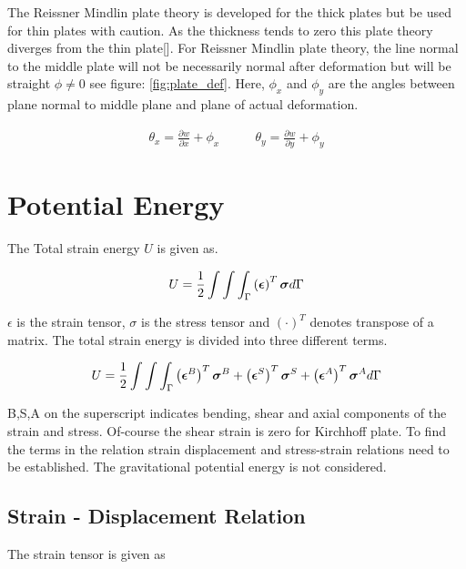 \documentclass[main.tex]{subfiles}
\begin{document}
The Reissner Mindlin plate theory is developed for the thick plates but be used for thin plates with caution.  As the thickness tends to zero this plate theory diverges from the thin plate[\cite{PlateandFEM}]. For Reissner Mindlin plate theory, the line normal to the middle plate will not be necessarily normal after deformation but will be straight $\phi \neq 0$ see figure: \ref{fig:plate_def}. Here, $\phi_x$ and $\phi_y$ are the angles between plane normal to middle plane and plane of actual deformation.  

\begin{align}
\theta_x  = \frac{\partial w }{\partial x} + \phi_x \quad & \quad
\theta_y  = \frac{\partial w }{\partial y} + \phi_y
\end{align}

\section{Potential Energy}

The Total strain energy $U$ is given as.

\begin{equation}
U=\frac{1}{2} \int\int\int_\Gamma \left(\boldsymbol{\epsilon}\right)^T \boldsymbol{\sigma} d \Gamma
\end{equation}

$\epsilon$ is the strain tensor, $\sigma$ is the stress tensor and $\left( \cdot \right)^T$ denotes transpose of a matrix. The total strain energy is divided into three different terms. 


\begin{equation}
U=\frac{1}{2} \int\int\int_\Gamma \left(\boldsymbol{\epsilon}^B\right)^T \boldsymbol{\sigma}^B + \left(\boldsymbol{\epsilon}^S\right)^T \boldsymbol{\sigma}^S + \left(\boldsymbol{\epsilon}^A\right)^T \boldsymbol{\sigma}^A d \Gamma
\end{equation}

B,S,A on the superscript indicates bending, shear and axial components of the strain and stress. Of-course the shear strain is zero for Kirchhoff plate. To find the terms in the relation strain displacement and stress-strain relations need to be established. The gravitational potential energy is not considered. 

\subsection{Strain - Displacement Relation}

The strain tensor is given as 
\end{document}
